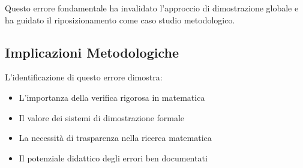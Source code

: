 \documentclass[11pt,a4paper]{article}
\begin{document}
Questo errore fondamentale ha invalidato l'approccio di dimostrazione globale e ha guidato il riposizionamento come caso studio metodologico.

\subsection{Implicazioni Metodologiche}

L'identificazione di questo errore dimostra:
\begin{itemize}
\item L'importanza della verifica rigorosa in matematica
\item Il valore dei sistemi di dimostrazione formale
\item La necessità di trasparenza nella ricerca matematica
\item Il potenziale didattico degli errori ben documentati
\end{itemize}
\end{document}
